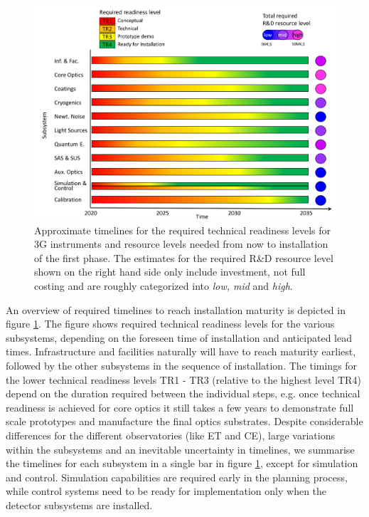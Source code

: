 \section*{}
\begin{figure}[h]
\centering
\includegraphics*[width= \textwidth]{Figures/3G_Readiness_Levelsblue.pdf}
\caption{Approximate timelines for the required technical readiness levels for 3G instruments and resource levels needed from now to installation of the first phase. The estimates for the required R\&D resource level shown on the right hand side only include investment, not full costing and are roughly categorized into \textit{low, mid} and \textit{high}.\\
}
\label{fig:maturity}
\end{figure}

An overview of required timelines to reach installation maturity is depicted in figure \ref{fig:maturity}. The figure shows required technical readiness levels for the various subsystems, depending on the foreseen time of installation and anticipated lead times. Infrastructure and facilities naturally will have to reach maturity earliest, followed by the other subsystems in the sequence of installation. The timings for the lower technical readiness levels TR1 - TR3 (relative to the highest level TR4) depend on the duration required between the individual steps, e.g. once technical readiness is achieved for core optics it still takes a few years to demonstrate full scale prototypes and manufacture the final optics substrates. Despite considerable differences for the different observatories (like ET and CE), large variations within the subsystems and an inevitable uncertainty in timelines, we summarise the timelines  for each subsystem in a single bar in figure \ref{fig:maturity}, except for simulation and control. Simulation capabilities are required early in the planning process, while control systems need to be ready for implementation only when the detector subsystems are installed.  

